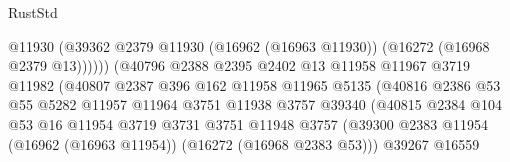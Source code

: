 \begin{lexlean}{RustStd}
\begin{coremodule}
                                            @11930
                                            (@39362
                                              @2379
                                              @11930
                                              (@16962 (@16963 @11930))
                                              (@16272 (@16968 @2379 @13))))))
                                      (@40796
                                        @2388
                                        @2395
                                        @2402
                                        @13
                                        @11958
                                        @11967
                                        @3719
                                        @11982
                                        (@40807
                                          @2387
                                          @396
                                          @162
                                          @11958
                                          @11965
                                          @5135
                                          (@40816
                                            @2386
                                            @53
                                            @55
                                            @5282
                                            @11957
                                            @11964
                                            @3751
                                            @11938
                                            @3757
                                            @39340
                                            (@40815
                                              @2384
                                              @104
                                              @53
                                              @16
                                              @11954
                                              @3719
                                              @3731
                                              @3751
                                              @11948
                                              @3757
                                              (@39300
                                                @2383
                                                @11954
                                                (@16962 (@16963 @11954))
                                                (@16272 (@16968 @2383 @53)))
                                              @39267
                                              @16559

\end{coremodule}
\end{lexlean}

